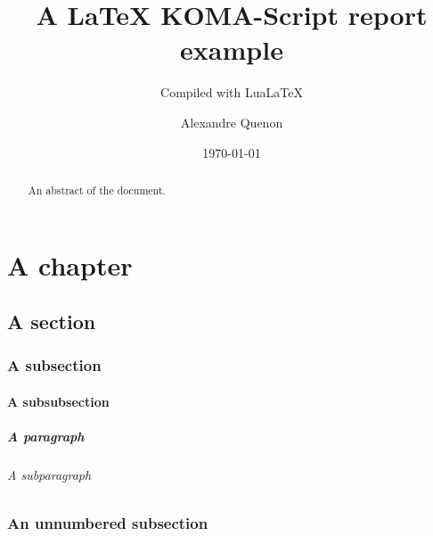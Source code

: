 \documentclass[%
	paper=A4,portrait,%
	fontsize=11pt,%
]{scrreprt}
\title{A \LaTeX{} KOMA-Script report example}
\subtitle{Compiled with Lua\LaTeX{}}
\author{Alexandre Quenon}
\date{\today}
\begin{document}

\maketitle

\tableofcontents


\begin{abstract}
	An abstract of the document.
	
	\lipsum[1-2]
\end{abstract}


\chapter{A chapter}

	\lipsum[1]


	\section{A section}
	
		\lipsum[2]
		
		
		\subsection{A subsection}
		
			\lipsum[3]
			
			
			\subsubsection{A subsubsection}
			
				\lipsum[4]
				
				
				\paragraph{A paragraph}
				
					\lipsum[5]
					
					
					\subparagraph{A subparagraph}
					
						\lipsum[6]
	


	\lipsum[1]
	
	
	
		\lipsum[2]
		
		
		\subsection*{An unnumbered subsection}
		
			\lipsum[3]




\end{document}
